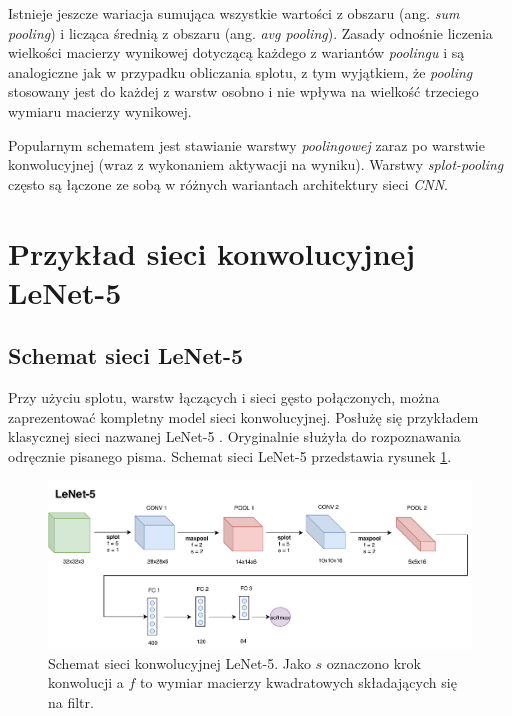 Istnieje jeszcze wariacja sumująca wszystkie wartości z obszaru (ang. \textit{sum pooling}) i licząca średnią z obszaru (ang. \textit{avg pooling}). Zasady odnośnie liczenia wielkości macierzy wynikowej dotyczącą każdego z wariantów \textit{poolingu} i są analogiczne jak w przypadku obliczania splotu, z tym wyjątkiem, że \textit{pooling} stosowany jest do każdej z warstw osobno i nie wpływa na wielkość trzeciego wymiaru macierzy wynikowej.

Popularnym schematem jest stawianie warstwy \textit{poolingowej} zaraz po warstwie konwolucyjnej (wraz z wykonaniem aktywacji na wyniku). Warstwy \textit{splot-pooling} często są łączone ze sobą w różnych wariantach architektury sieci \textit{CNN}.

\section{Przykład sieci konwolucyjnej LeNet-5}
\label{lenet5}

\subsection{Schemat sieci LeNet-5}

Przy użyciu splotu, warstw łączących i sieci gęsto połączonych, można zaprezentować kompletny model sieci konwolucyjnej. Posłużę się przykładem klasycznej sieci nazwanej LeNet-5 \cite{lenetpaper}. Oryginalnie służyła do rozpoznawania odręcznie pisanego pisma.
Schemat sieci LeNet-5 przedstawia rysunek \ref{fig:lenet5}.

\begin{figure}[ht]
\centerline{\includegraphics[scale=0.65]{resources/cnn/lenet5.pdf}}
\caption{Schemat sieci konwolucyjnej LeNet-5. Jako \(s\) oznaczono krok konwolucji a \(f\) to wymiar macierzy kwadratowych składających się na filtr.}
\label{fig:lenet5}
\end{figure}

